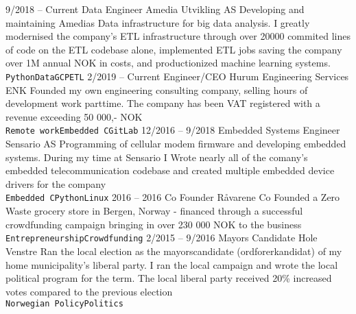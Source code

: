 \documentclass[9pt]{developercv} %
\begin{document}
\begin{entrylist}
	\entry
		{9/2018 -- Current}
		{Data Engineer}
		{Amedia Utvikling AS}
		{Developing and maintaining Amedias Data infrastructure for big data analysis. I greatly modernised the 
    company's ETL infrastructure through over 20000 commited lines of code on the ETL
    codebase alone, implemented ETL jobs saving the company over 1M annual NOK in costs, and productionized
    machine learning systems.
    \\ \texttt{Python}\slashsep\texttt{Data}\slashsep\texttt{GCP}\slashsep\texttt{ETL}}
	\entry
		{2/2019 -- Current}
		{Engineer/CEO}
		{Hurum Engineering Services ENK}
		{Founded my own engineering consulting company, selling hours of development
    work parttime. The company has been VAT registered with a revenue exceeding 50 000,- NOK
    \\ \texttt{Remote work}\slashsep\texttt{Embedded C}\slashsep\texttt{GitLab}}
	\entry
		{12/2016 -- 9/2018}
		{Embedded Systems Engineer}
		{Sensario AS}
		{Programming of cellular modem firmware and developing embedded systems. During my time at Sensario I
     Wrote nearly all of the comany's embedded telecommunication codebase and 
     created multiple embedded device drivers for the company 
     \\ \texttt{Embedded C}\slashsep\texttt{Python}\slashsep\texttt{Linux}}
	 \entry
		 {2016 -- 2016}
		 {Co Founder}
     {Råvarene}
		 {Co Founded a Zero Waste grocery store in Bergen, Norway - financed through a successful
      crowdfunding campaign bringing in over 230 000 NOK to the business\\ \texttt{Entrepreneurship}\slashsep\texttt{Crowdfunding}}
	\entry
		{2/2015 -- 9/2016}
		{Mayors Candidate}
    {Hole Venstre}
    {Ran the local election as the mayorscandidate (ordforerkandidat) of my home municipality's liberal party.
     I ran the local campaign and wrote the local political program for the term.  The local liberal party
     received 20\% increased votes compared to the previous election\\ \texttt{Norwegian Policy}\slashsep\texttt{Politics}}
\end{entrylist}


\end{document}
